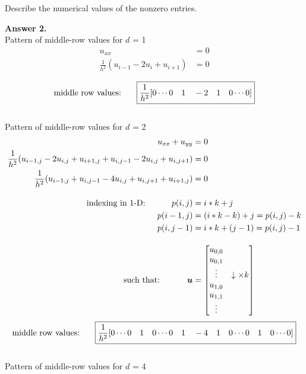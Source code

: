 \documentclass[12pt]{article}
\newenvironment{exercise}[2][Exercise]{\begin{trivlist}
\item[\hskip \labelsep {\bfseries #1}\hskip \labelsep {\bfseries #2.}]}{\end{trivlist}}
\begin{document}
\vspace{5mm}
\begin{exercise}{2}
	Describe the numerical values of the nonzero entries.
\end{exercise}%
\textbf{Answer 2.} \\
Pattern of middle-row values for $d$ = 1
\begin{align*}
	u_{xx} &= 0 \\
	\frac{1}{h^2}(u_{i-1} - 2u_i + u_{i+1}) &= 0 \\
\end{align*}
\[	\textnormal{middle row values: \hspace{5mm}} \boxed{ \frac{1}{h^2} 
[0 \dotsm 0 \quad 1 \quad -2 \quad 1 \quad 0 \dotsm 0] } \] \\
Pattern of middle-row values for $d$ = 2
\begin{align*}
u_{xx} + u_{yy} &= 0 \\
\frac{1}{h^2}(u_{i-1,j} - 2u_{i,j} + u_{i+1,j} + u_{i,j-1} - 2u_{i,j} + u_{i,j+1}) &= 0 \\
\frac{1}{h^2}(u_{i-1,j} + u_{i,j-1} - 4u_{i,j} + u_{i,j+1} + u_{i+1,j}) &= 0 \\[10pt]
\textnormal{indexing in 1-D: \hspace{10mm}} p(i,j) &= i*k + j \\
	p(i-1,j) &= (i*k - k) + j = p(i,j) - k \\
	p(i, j-1) &= i*k + (j - 1) = p(i,j) - 1 \\[10pt]
\textnormal{such that: \hspace{10mm}} \bm{u} &= \begin{bmatrix}
	u_{0,0}& \\ u_{0,1} & \\  \vdots & \downarrow \times k \\ u_{1,0} & \\ u_{1,1} & \\ \vdots &	\end{bmatrix} \\
\end{align*}
\[ \textnormal{middle row values: \hspace{5mm}} \boxed{ \frac{1}{h^2} 
[0 \dotsm 0 \quad 1 \quad 0 \dotsm 0 \quad 1 \quad -4 \quad 1 \quad 0 \dotsm 0 \quad 1 \quad 0 \dotsm 0]  } \] \\
Pattern of middle-row values for $d$ = 4
\end{document}
